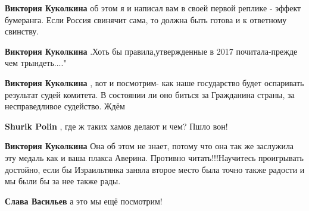 \begin{itemize}
\begin{itemize}
\textbf{Виктория Куколкина} об этом я и написал вам в своей первой реплике -
эффект бумеранга. Если Россия свинячит сама, то должна быть готова и к
ответному свинству.

 
\textbf{Виктория Куколкина} .Хоть бы правила,утвержденные в 2017 почитала-прежде чем трындеть...."

 
\textbf{Виктория Куколкина} , вот и посмотрим- как наше государство будет оспаривать результат судей комитета. В состоянии ли оно биться за Гражданина страны, за несправедливое судейство. Ждём

 
\textbf{Shurik Polin} , где ж таких хамов делают и чем? Пшло вон!

 
\textbf{Виктория Куколкина} Она об этом не знает, потому что она так же заслужила эту медаль как и ваша плакса Аверина. Противно читать!!!Научитесь проигрывать достойно, если бы Израильтянка заняла второе место была точно также радости и мы были бы за нее также рады.

 
\textbf{Слава Васильев} а это мы ещё посмотрим!

 

\end{itemize}
\end{itemize}

